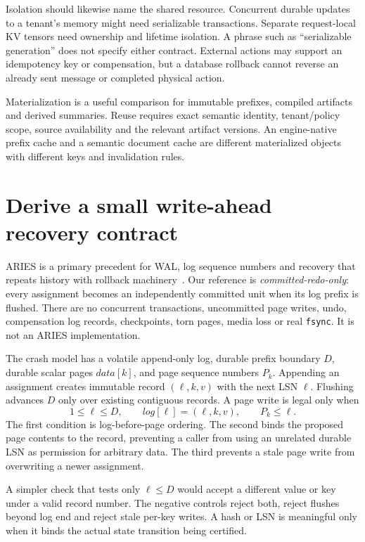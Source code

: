 Isolation should likewise name the shared resource. Concurrent durable updates
to a tenant's memory might need serializable transactions. Separate request-local
KV tensors need ownership and lifetime isolation. A phrase such as ``serializable
generation'' does not specify either contract. External actions may support
an idempotency key or compensation, but a database rollback cannot reverse an
already sent message or completed physical action.

Materialization is a useful comparison for immutable prefixes, compiled
artifacts and derived summaries. Reuse requires exact semantic identity,
tenant/policy scope, source availability and the relevant artifact versions.
An engine-native prefix cache and a semantic document cache are different
materialized objects with different keys and invalidation rules.

\section{Derive a small write-ahead recovery contract}
\label{evod42:wal}
ARIES is a primary precedent for WAL, log sequence numbers and recovery that
repeats history with rollback machinery~\cite{evod42:aries}. Our reference is
\emph{committed-redo-only}: every assignment becomes an independently committed
unit when its log prefix is flushed. There are no concurrent transactions,
uncommitted page writes, undo, compensation log records, checkpoints, torn
pages, media loss or real \texttt{fsync}. It is not an ARIES implementation.

The crash model has a volatile append-only log, durable prefix boundary $D$,
durable scalar pages $data[k]$, and page sequence numbers $P_k$. Appending an
assignment creates immutable record $(\ell,k,v)$ with the next LSN $\ell$.
Flushing advances $D$ only over existing contiguous records. A page write is
legal only when
\begin{equation}
 1\le\ell\le D,\qquad log[\ell]=(\ell,k,v),\qquad P_k\le\ell.
 \label{evod42:walrule}
\end{equation}
The first condition is log-before-page ordering. The second binds the proposed
page contents to the record, preventing a caller from using an unrelated
durable LSN as permission for arbitrary data. The third prevents a stale page
write from overwriting a newer assignment.

A simpler check that tests only $\ell\le D$ would accept a different value or key
under a valid record number. The negative controls reject both, reject flushes beyond log end and reject stale
per-key writes. A hash or LSN is meaningful only when it binds the actual
state transition being certified.

